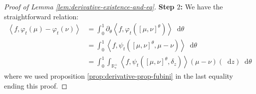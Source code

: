 \documentclass[11pt,a4paper]{article}
\newcommand{\RRP}{\mathbb{R}^+_*}
\newcommand{\MC}{\mathcal{M}}
\newcommand{\SCE}{\emph{SCE}}
\newcommand{\Proc}[1]{\left(#1\right)_{t\geq 0}}
\newcommand{\brac}[1]{\left\langle#1\right\rangle}
\newcommand{\dd}{\mathop{}\!\mathrm{d}}
\newtheorem{lemma}[theorem]{Lemma}
\begin{document}
\begin{proof}[Proof of Lemma \ref{lem:derivative-existence-and-eq}]
    \textbf{Step $2$:} We have the straightforward relation:
    \begin{align*}
        \brac{f,\varphi_t(\mu) - \varphi_t(\nu)} &= \int_0^1 \partial_\theta \brac{f,\varphi_t\left(\left[\mu,\nu \right]^\theta\right)} \dd \theta \\
        &= \int_0^1 \brac{f,\psi_t\left(\left[\mu,\nu \right]^\theta,\mu-\nu\right)} \dd \theta \\
        &= \int_0^1 \int_{\RRP} \brac{f,\psi_t\left(\left[\mu,\nu \right]^\theta,\delta_z\right)}(\mu - \nu)(\dd z) \dd \theta
    \end{align*}
    where we used proposition \ref{prop:derivative-prop-fubini} in the last equality ending this proof.
\end{proof}


\end{document}
